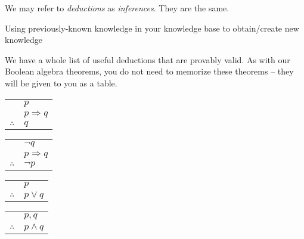 \documentclass[main.tex]{subfiles}
\begin{document}
We may refer to \textit{deductions} as \textit{inferences}. They are the same.

\begin{defn}[Deductions]
	Using previously-known knowledge in your knowledge base to obtain/create new knowledge
\end{defn}

We have a whole list of useful deductions that are provably valid. As with our Boolean algebra theorems, you do not need to memorize these theorems -- they will be given to you as a table.

\begin{thm}
	\mbox{}
	\begin{center}
		\begin{tabular}{c@{\,}l@{}}
			& \(p\) \\
			& \(p \Rightarrow q\) \\
			\cline{2-2}
			\(\therefore\) & \(q\)
		\end{tabular}
	\end{center}
\end{thm}

\begin{thm}
	\mbox{}
	\begin{center}
		\begin{tabular}{c@{\,}l@{}}
			& \(\lnot q\) \\
			& \(p \Rightarrow q\) \\
			\cline{2-2}
			\(\therefore\) & \(\lnot p\)
		\end{tabular}
	\end{center}
\end{thm}

\begin{thm}
	\mbox{}
	\begin{center}
		\begin{tabular}{c@{\,}l@{}}
			& \(p\) \\
			\cline{2-2}
			\(\therefore\) & \(p \lor q\)
		\end{tabular}
	\end{center}
\end{thm}

\begin{thm}
	\mbox{}
	\begin{center}
		\begin{tabular}{c@{\,}l@{}}
			& \(p,q\) \\
			\cline{2-2}
			\(\therefore\) & \(p \land q\)
		\end{tabular}
	\end{center}
\end{thm}
\end{document}
